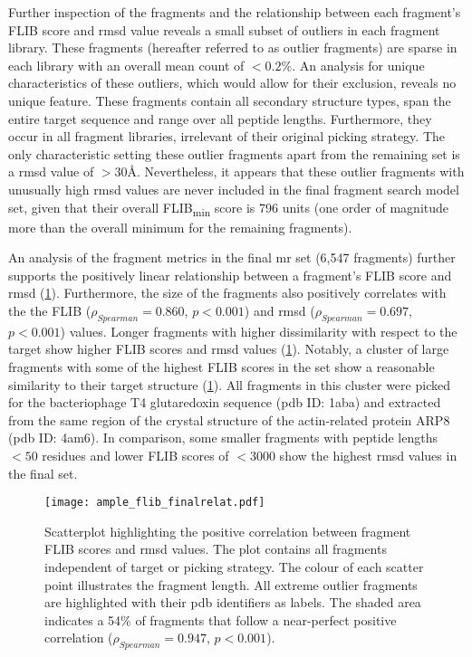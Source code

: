 Further inspection of the fragments and the relationship between each fragment's FLIB score and \gls{rmsd} value reveals a small subset of outliers in each fragment library. These fragments (hereafter referred to as outlier fragments) are sparse in each library with an overall mean count of $<0.2$\%. An analysis for unique characteristics of these outliers, which would allow for their exclusion, reveals no unique feature. These fragments contain all secondary structure types, span the entire target sequence and range over all peptide lengths. Furthermore, they occur in all fragment libraries, irrelevant of their original picking strategy. The only characteristic setting these outlier fragments apart from the remaining set is a \gls{rmsd} value of $>30$\AA. Nevertheless, it appears that these outlier fragments with unusually high \gls{rmsd} values are never included in the final fragment search model set, given that their overall FLIB\textsubscript{min} score is 796 units (one order of magnitude more than the overall minimum for the remaining fragments).

An analysis of the fragment metrics in the final \gls{mr} set (6,547 fragments) further supports the positively linear relationship between a fragment's FLIB score and \gls{rmsd} (\cref{fig:ample_flib_finalrelat}). Furthermore, the size of the fragments also positively correlates with the the FLIB ($\rho_{Spearman}=0.860$, $p<0.001$) and \gls{rmsd} ($\rho_{Spearman}=0.697$, $p<0.001$) values. Longer fragments with higher dissimilarity with respect to the target show higher FLIB scores and \gls{rmsd} values (\cref{fig:ample_flib_finalrelat}). Notably, a cluster of large fragments with some of the highest FLIB scores in the set show a reasonable similarity to their target structure (\cref{fig:ample_flib_finalrelat}). All fragments in this cluster were picked for the bacteriophage T4 glutaredoxin sequence (\gls{pdb} ID: 1aba) and extracted from the same region of the crystal structure of the actin-related protein ARP8 (\gls{pdb} ID: 4am6). In comparison, some smaller fragments with peptide lengths $<50$ residues and lower FLIB scores of $<3000$ show the highest \gls{rmsd} values in the final set.

\begin{figure}[H]
	\centering
	\texttt{[image: ample\_flib\_finalrelat.pdf]}
	\caption[Correlation analysis for final FLIB \gls{mr} fragments]{Scatterplot highlighting the positive correlation between fragment FLIB scores and \gls{rmsd} values. The plot contains all fragments independent of target or picking strategy. The colour of each scatter point illustrates the fragment length. All extreme outlier fragments are highlighted with their \gls{pdb} identifiers as labels. The shaded area indicates a 54\% of fragments that follow a near-perfect positive correlation ($\rho_{Spearman}=0.947$, $p<0.001$).}
	\label{fig:ample_flib_finalrelat}
\end{figure}

